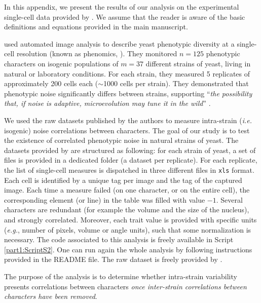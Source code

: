 
In this appendix, we present the results of our analysis on the experimental single-cell data provided by \cite{yvert-et-al-2013}. We assume that the reader is aware of the basic definitions and equations provided in the main manuscript.

\cite{yvert-et-al-2013} used automated image analysis to describe yeast phenotypic diversity at a single-cell resolution (known as phenomics, \citealt{ohya-et-al-2015}). They monitored $n=125$ phenotypic characters on isogenic populations of $m=37$ different strains of yeast, living in natural or laboratory conditions. For each strain, they measured 5 replicates of approximately 200 cells each ($\sim$1000 cells per strain). They demonstrated that phenotypic noise significantly differs between strains, supporting ``\textit{the possibility that, if noise is adaptive, microevolution may tune it in the wild}'' \citep{yvert-et-al-2013}.

We used the raw datasets published by the authors to measure intra-strain (\textit{i.e.} isogenic) noise correlations between characters. The goal of our study is to test the existence of correlated phenotypic noise in natural strains of yeast. The datasets provided by \cite{yvert-et-al-2013} are structured as following: for each strain of yeast, a set of files is provided in a dedicated folder (a dataset per replicate). For each replicate, the list of single-cell measures is dispatched in three different files in \texttt{xls} format. Each cell is identified by a unique tag per image and the tag of the captured image. Each time a measure failed (on one character, or on the entire cell), the corresponding element (or line) in the table was filled with value $-1$.
Several characters are redundant (for example the volume and the size of the nucleus), and strongly correlated. Moreover, each trait value is provided with specific units (\textit{e.g.}, number of pixels, volume or angle units), such that some normalization is necessary.
The code associated to this analysis is freely available in Script \ref{part1:ScriptS2}. One can run again the whole analysis by following instructions provided in the README file. The raw dataset is freely provided by \cite{yvert-et-al-2013}.

The purpose of the analysis is to determine whether intra-strain variability presents correlations between characters \textit{once inter-strain correlations  between characters have been removed}. 

